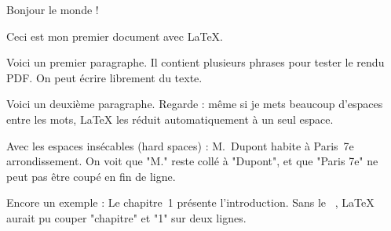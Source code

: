 \documentclass[a4paper,12pt]{article} %
\begin{document}
Bonjour le monde !

Ceci est mon premier document avec \LaTeX.

Voici un premier paragraphe.  
Il contient plusieurs phrases pour tester le rendu PDF.  
On peut écrire librement du texte.    

Voici un deuxième paragraphe.   
Regarde : même si je mets       beaucoup d’espaces entre les mots,   
LaTeX les réduit automatiquement à un seul espace.  

Avec les espaces insécables (hard spaces) :  
M.~Dupont habite à Paris~7e arrondissement.  
On voit que "M." reste collé à "Dupont", et que "Paris 7e" ne peut pas être coupé en fin de ligne.

Encore un exemple :  
Le chapitre~1 présente l’introduction.  
Sans le ~, LaTeX aurait pu couper "chapitre" et "1" sur deux lignes.
\end{document}
